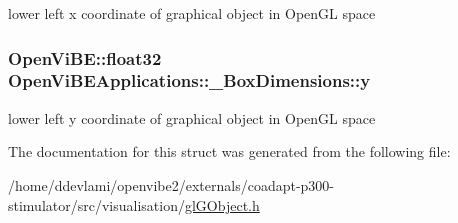 \label{structOpenViBEApplications_1_1__BoxDimensions_a14cab78068cc81ed7119b6111c6af659}
lower left x coordinate of graphical object in OpenGL space \hypertarget{structOpenViBEApplications_1_1__BoxDimensions_a2069960def89763c418aeb503a96cbd7}{
\subsubsection[{y}]{\setlength{\rightskip}{0pt plus 5cm}OpenViBE::float32 {\bf OpenViBEApplications::\_\-BoxDimensions::y}}}
\label{structOpenViBEApplications_1_1__BoxDimensions_a2069960def89763c418aeb503a96cbd7}
lower left y coordinate of graphical object in OpenGL space 

The documentation for this struct was generated from the following file:\begin{DoxyCompactItemize}
\item 
/home/ddevlami/openvibe2/externals/coadapt-\/p300-\/stimulator/src/visualisation/\hyperlink{glGObject_8h}{glGObject.h}\end{DoxyCompactItemize}

